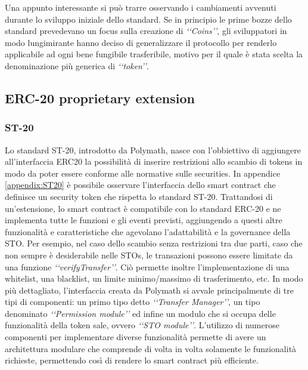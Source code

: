 Una appunto interessante si può trarre osservando i cambiamenti avvenuti durante lo sviluppo iniziale dello standard. Se in principio le prime bozze dello standard prevedevano un focus sulla creazione di \textit{‘‘Coins’’}, gli sviluppatori in modo lungimirante hanno deciso di generalizzare il protocollo per renderlo applicabile ad ogni bene fungibile trasferibile, motivo per il quale è stata scelta la denominazione più generica di \textit{‘‘token’’}.

\subsection{ERC-20 proprietary extension}
\subsubsection{ST-20}
Lo standard ST-20, introdotto da Polymath, nasce con l'obbiettivo di aggiungere all'interfaccia ERC20 la possibilità di inserire restrizioni allo scambio di tokens in modo da poter essere conforme alle normative sulle securities. 
In appendice \ref{appendix:ST20} è possibile osservare l'interfaccia dello smart contract che definisce un security token che rispetta lo standard ST-20. Trattandosi di un'estensione, lo smart contract è compatibile con lo standard ERC-20 e ne implementa tutte le funzioni e gli eventi previsti, aggiungendo a questi altre funzionalità e caratteristiche che agevolano l'adattabilità e la governance della STO. Per esempio, nel caso dello scambio senza restrizioni tra due parti, caso che non sempre è desiderabile nelle STOs, le transazioni possono essere limitate da una funzione \textit{‘‘verifyTransfer’’}. Ciò permette inoltre l'implementazione di una whitelist, una blacklist, un limite minimo/massimo di trasferimento, etc. 
In modo più dettagliato, l'interfaccia creata da Polymath si avvale principalmente di tre tipi di componenti: un primo tipo detto \textit{‘‘Transfer Manager’’}, un tipo  denominato \textit{‘‘Permission module’’} ed infine un modulo che si occupa delle funzionalità della token sale, ovvero \textit{‘‘STO module’’}. 
L'utilizzo di numerose componenti per implementare diverse funzionalità permette di avere un architettura modulare che comprende di volta in volta solamente le funzionalità richieste, permettendo così di rendere lo smart contract più efficiente.

